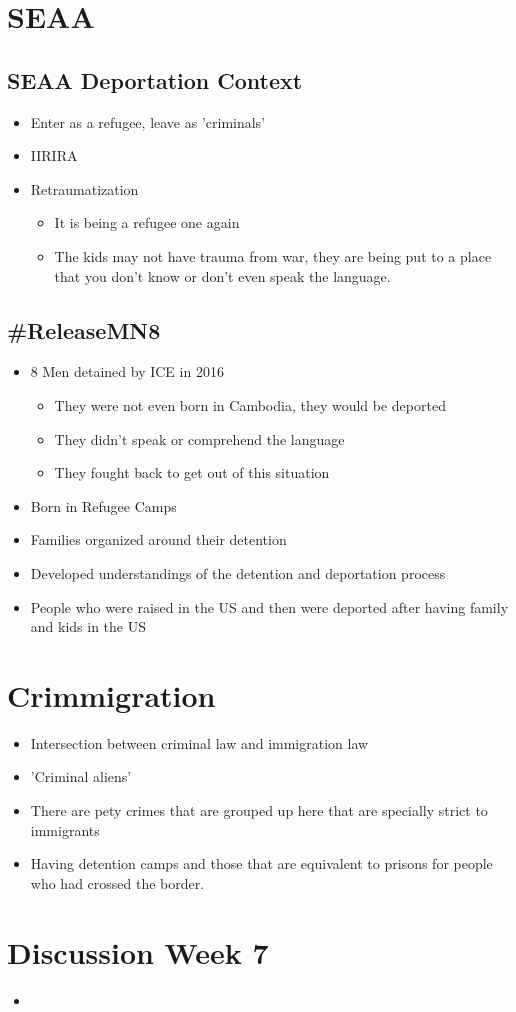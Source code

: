 \documentclass{article}
\begin{document}
\section{SEAA}

\subsection{SEAA Deportation Context}
\begin{itemize}
  \item Enter as a refugee, leave as 'criminals'
  \item IIRIRA
  \item Retraumatization
    \begin{itemize}
      \item It is being a refugee one again
      \item The kids may not have trauma from war, they
        are being put to a place that you don't know
        or don't even speak the language.
    \end{itemize}
\end{itemize}

\subsection{\#ReleaseMN8}
\begin{itemize}
  \item 8 Men detained by ICE in 2016
    \begin{itemize}
      \item They were not even born in Cambodia, they
        would be deported
      \item They didn't speak or comprehend the language
      \item They fought back to get out of this situation
    \end{itemize}
  \item Born in Refugee Camps
  \item Families organized around their detention
  \item Developed understandings of the detention and deportation process
  \item People who were raised in the US and then were deported
    after having family and kids in the US
\end{itemize}

\section{Crimmigration}
\begin{itemize}
  \item Intersection between criminal law and immigration law
  \item 'Criminal aliens'
  \item There are pety crimes that are grouped up here
    that are specially strict to immigrants
  \item Having detention camps and those that are equivalent to prisons
    for people who had crossed the border.
\end{itemize}

\section*{Discussion Week 7}
\begin{itemize}
  \item 
\end{itemize}
\end{document}

